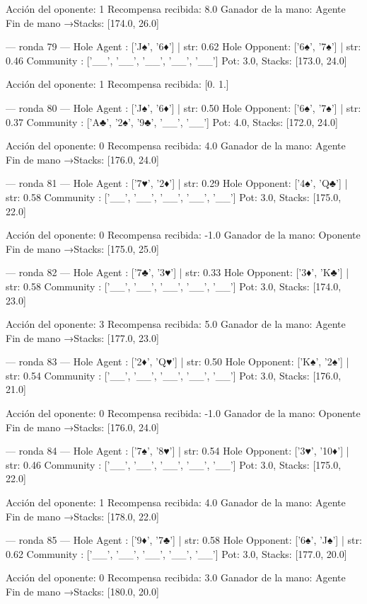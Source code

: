 Acción del oponente: 1
Recompensa recibida: 8.0
Ganador de la mano: Agente
Fin de mano →Stacks: [174.0, 26.0]


--- ronda 79 ---
Hole Agent : ['J♠', '6♦'] | str: 0.62
Hole Opponent: ['6♠', '7♠'] | str: 0.46
Community  : ['__', '__', '__', '__', '__']
Pot: 3.0, Stacks: [173.0, 24.0]

Acción del oponente: 1
Recompensa recibida: [0. 1.]

--- ronda 80 ---
Hole Agent : ['J♠', '6♦'] | str: 0.50
Hole Opponent: ['6♠', '7♠'] | str: 0.37
Community  : ['A♣', '2♠', '9♣', '__', '__']
Pot: 4.0, Stacks: [172.0, 24.0]

Acción del oponente: 0
Recompensa recibida: 4.0
Ganador de la mano: Agente
Fin de mano →Stacks: [176.0, 24.0]


--- ronda 81 ---
Hole Agent : ['7♥', '2♦'] | str: 0.29
Hole Opponent: ['4♠', 'Q♣'] | str: 0.58
Community  : ['__', '__', '__', '__', '__']
Pot: 3.0, Stacks: [175.0, 22.0]

Acción del oponente: 0
Recompensa recibida: -1.0
Ganador de la mano: Oponente
Fin de mano →Stacks: [175.0, 25.0]


--- ronda 82 ---
Hole Agent : ['7♣', '3♥'] | str: 0.33
Hole Opponent: ['3♦', 'K♣'] | str: 0.58
Community  : ['__', '__', '__', '__', '__']
Pot: 3.0, Stacks: [174.0, 23.0]

Acción del oponente: 3
Recompensa recibida: 5.0
Ganador de la mano: Agente
Fin de mano →Stacks: [177.0, 23.0]


--- ronda 83 ---
Hole Agent : ['2♦', 'Q♥'] | str: 0.50
Hole Opponent: ['K♠', '2♠'] | str: 0.54
Community  : ['__', '__', '__', '__', '__']
Pot: 3.0, Stacks: [176.0, 21.0]

Acción del oponente: 0
Recompensa recibida: -1.0
Ganador de la mano: Oponente
Fin de mano →Stacks: [176.0, 24.0]


--- ronda 84 ---
Hole Agent : ['7♠', '8♥'] | str: 0.54
Hole Opponent: ['3♥', '10♦'] | str: 0.46
Community  : ['__', '__', '__', '__', '__']
Pot: 3.0, Stacks: [175.0, 22.0]

Acción del oponente: 1
Recompensa recibida: 4.0
Ganador de la mano: Agente
Fin de mano →Stacks: [178.0, 22.0]


--- ronda 85 ---
Hole Agent : ['9♦', '7♣'] | str: 0.58
Hole Opponent: ['6♠', 'J♠'] | str: 0.62
Community  : ['__', '__', '__', '__', '__']
Pot: 3.0, Stacks: [177.0, 20.0]

Acción del oponente: 0
Recompensa recibida: 3.0
Ganador de la mano: Agente
Fin de mano →Stacks: [180.0, 20.0]


